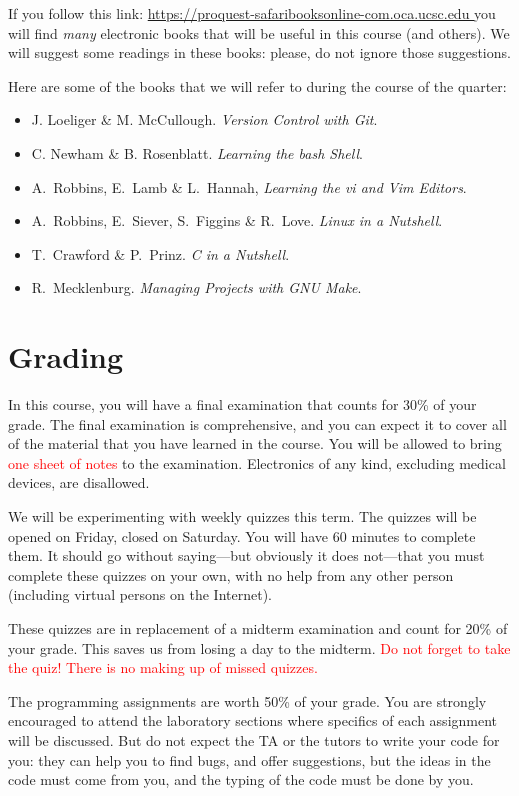 \documentclass{article}
\begin{document}
If you follow this link:
\url{https://proquest-safaribooksonline-com.oca.ucsc.edu }
you will find \emph{many} electronic books that will be useful in
this course (and others). We will suggest some readings in these
books: please, do not ignore those suggestions.

Here are some of the books that we will refer to during the course of the
quarter:
\begin{itemize}
\item J.\xspace Loeliger \& M.\xspace McCullough. \emph{Version Control with Git}.
\item C.\xspace Newham \& B.\xspace Rosenblatt. \emph{Learning the bash Shell}.
\item A.\ Robbins, E.\ Lamb \& L.\ Hannah, \emph{Learning the vi and Vim Editors}.
\item A.\ Robbins, E.\ Siever, S.\ Figgins \& R.\ Love. \emph{Linux in a Nutshell}.
\item T.\ Crawford \& P.\ Prinz. \emph{C in a Nutshell}.
\item R.\  Mecklenburg. \emph{Managing Projects with GNU Make}.
\end{itemize}

\section{Grading}
In this course, you will have a final examination that counts for 30\% of your
grade. The final examination is comprehensive, and you can expect it to cover
all of the material that you have learned in the course. You will be allowed
to bring \textcolor{red}{one sheet of notes} to the examination. Electronics
of any kind, excluding medical devices, are disallowed.

We will be experimenting with weekly quizzes this term. The quizzes will be
opened on Friday, closed on Saturday. You will have 60 minutes to complete them.
It should go without saying---but obviously it does not---that you must
complete these quizzes on your own, with no help from any other person
(including virtual persons on the Internet).

These quizzes are in replacement of a midterm examination and count
for 20\% of your grade. This saves us from losing a day to the
midterm.
\textcolor{red}{Do not forget
to take the quiz! There is no making up of missed quizzes.}

The programming assignments are worth 50\% of your grade. You are strongly
encouraged to attend the laboratory sections where specifics of each
assignment will be discussed. But do not expect the TA or the tutors to write
your code for you: they can help you to find bugs, and offer suggestions, but
the ideas in the code must come from you, and the typing of the code must be
done by you.
\end{document}
